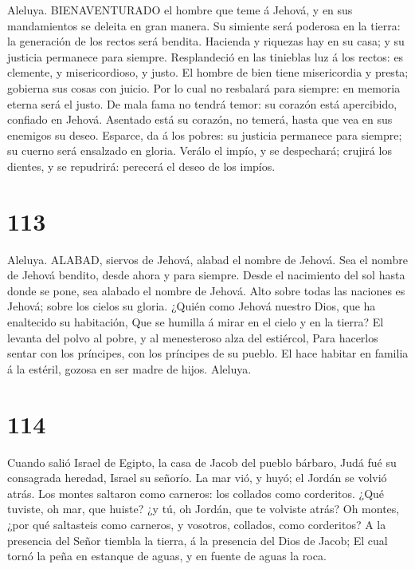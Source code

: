  Aleluya. BIENAVENTURADO el hombre que teme á Jehová, y en
sus mandamientos se deleita en gran manera.  Su simiente
será poderosa en la tierra: la generación de los rectos será bendita.
 Hacienda y riquezas hay en su casa; y su justicia permanece
para siempre.  Resplandeció en las tinieblas luz á los
rectos: es clemente, y misericordioso, y justo.  El hombre
de bien tiene misericordia y presta; gobierna sus cosas con juicio.
 Por lo cual no resbalará para siempre: en memoria eterna
será el justo.  De mala fama no tendrá temor: su corazón
está apercibido, confiado en Jehová.  Asentado está su
corazón, no temerá, hasta que vea en sus enemigos su deseo. 
Esparce, da á los pobres: su justicia permanece para siempre; su cuerno
será ensalzado en gloria.  Verálo el impío, y se
despechará; crujirá los dientes, y se repudrirá: perecerá el deseo de
los impíos.

\hypertarget{section-112}{%
\section{113}\label{section-112}}

 Aleluya. ALABAD, siervos de Jehová, alabad el nombre de
Jehová.  Sea el nombre de Jehová bendito, desde ahora y para
siempre.  Desde el nacimiento del sol hasta donde se pone,
sea alabado el nombre de Jehová.  Alto sobre todas las
naciones es Jehová; sobre los cielos su gloria.  ¿Quién como
Jehová nuestro Dios, que ha enaltecido su habitación,  Que
se humilla á mirar en el cielo y en la tierra?  El levanta
del polvo al pobre, y al menesteroso alza del estiércol, 
Para hacerlos sentar con los príncipes, con los príncipes de su pueblo.
 El hace habitar en familia á la estéril, gozosa en ser
madre de hijos. Aleluya.

\hypertarget{section-113}{%
\section{114}\label{section-113}}

 Cuando salió Israel de Egipto, la casa de Jacob del pueblo
bárbaro,  Judá fué su consagrada heredad, Israel su señorío.
 La mar vió, y huyó; el Jordán se volvió atrás. 
Los montes saltaron como carneros: los collados como corderitos.
 ¿Qué tuviste, oh mar, que huiste? ¿y tú, oh Jordán, que te
volviste atrás?  Oh montes, ¿por qué saltasteis como
carneros, y vosotros, collados, como corderitos?  A la
presencia del Señor tiembla la tierra, á la presencia del Dios de Jacob;
 El cual tornó la peña en estanque de aguas, y en fuente de
aguas la roca.

